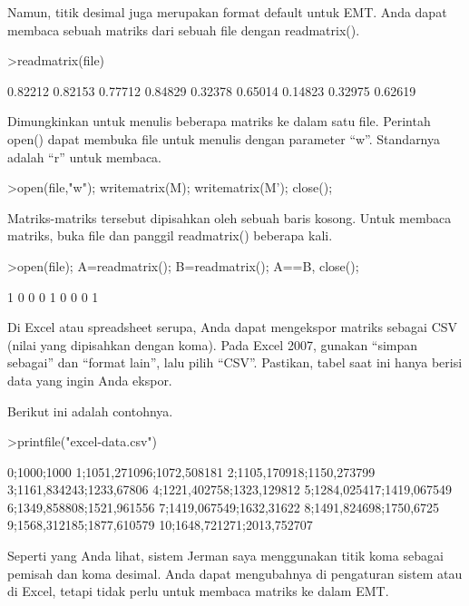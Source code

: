 \documentclass{article}
\begin{document}
\begin{eulernotebook}
\begin{eulercomment}
Namun, titik desimal juga merupakan format default untuk EMT. Anda
dapat membaca sebuah matriks dari sebuah file dengan readmatrix().
\end{eulercomment}
\begin{eulerprompt}
>readmatrix(file)
\end{eulerprompt}
\begin{euleroutput}
    0.82212   0.82153   0.77712 
    0.84829   0.32378   0.65014 
    0.14823   0.32975   0.62619 
\end{euleroutput}
\begin{eulercomment}
Dimungkinkan untuk menulis beberapa matriks ke dalam satu file.
Perintah open() dapat membuka file untuk menulis dengan parameter “w”.
Standarnya adalah “r” untuk membaca.
\end{eulercomment}
\begin{eulerprompt}
>open(file,"w"); writematrix(M); writematrix(M'); close();
\end{eulerprompt}
\begin{eulercomment}
Matriks-matriks tersebut dipisahkan oleh sebuah baris kosong. Untuk
membaca matriks, buka file dan panggil readmatrix() beberapa kali.
\end{eulercomment}
\begin{eulerprompt}
>open(file); A=readmatrix(); B=readmatrix(); A==B, close();
\end{eulerprompt}
\begin{euleroutput}
          1         0         0 
          0         1         0 
          0         0         1 
\end{euleroutput}
\begin{eulercomment}
Di Excel atau spreadsheet serupa, Anda dapat mengekspor matriks
sebagai CSV (nilai yang dipisahkan dengan koma). Pada Excel 2007,
gunakan “simpan sebagai” dan “format lain”, lalu pilih “CSV”.
Pastikan, tabel saat ini hanya berisi data yang ingin Anda ekspor.

Berikut ini adalah contohnya.
\end{eulercomment}
\begin{eulerprompt}
>printfile("excel-data.csv")
\end{eulerprompt}
\begin{euleroutput}
  0;1000;1000
  1;1051,271096;1072,508181
  2;1105,170918;1150,273799
  3;1161,834243;1233,67806
  4;1221,402758;1323,129812
  5;1284,025417;1419,067549
  6;1349,858808;1521,961556
  7;1419,067549;1632,31622
  8;1491,824698;1750,6725
  9;1568,312185;1877,610579
  10;1648,721271;2013,752707
\end{euleroutput}
\begin{eulercomment}
Seperti yang Anda lihat, sistem Jerman saya menggunakan titik koma
sebagai pemisah dan koma desimal. Anda dapat mengubahnya di pengaturan
sistem atau di Excel, tetapi tidak perlu untuk membaca matriks ke
dalam EMT.


\end{eulercomment}
\end{eulernotebook}
\end{document}
